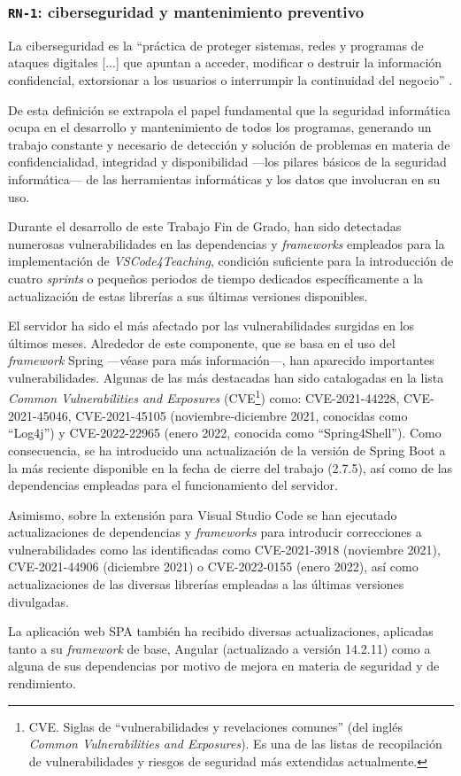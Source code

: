 \subsubsection{\texttt{RN-1}: ciberseguridad y mantenimiento preventivo}
\label{subsec:rn1}

La ciberseguridad es la ``práctica de proteger sistemas, redes y programas de ataques digitales [...] que apuntan a acceder, modificar o destruir la información confidencial, extorsionar a los usuarios o interrumpir la continuidad del negocio'' \cite{rn1_queEsCiber}.

De esta definición se extrapola el papel fundamental que la seguridad informática ocupa en el desarrollo y mantenimiento de todos los programas, generando un trabajo constante y necesario de detección y solución de problemas en materia de confidencialidad, integridad y disponibilidad ---los pilares básicos de la seguridad informática--- de las herramientas informáticas y los datos que involucran en su uso.

Durante el desarrollo de este Trabajo Fin de Grado, han sido detectadas numerosas vulnerabilidades en las dependencias y \textit{frameworks} empleados para la implementación de \textit{VSCode4Teaching}, condición suficiente para la introducción de cuatro \textit{sprints} o pequeños periodos de tiempo dedicados específicamente a la actualización de estas librerías a sus últimas versiones disponibles.

El servidor ha sido el más afectado por las vulnerabilidades surgidas en los últimos meses. Alrededor de este componente, que se basa en el uso del \textit{framework} Spring ---véase  para más información---, han aparecido importantes vulnerabilidades. Algunas de las más destacadas han sido catalogadas en la lista \textit{Common Vulnerabilities and Exposures} (CVE\footnote{CVE. Siglas de ``vulnerabilidades y revelaciones comunes'' (del inglés \textit{Common Vulnerabilities and Exposures}). Es una de las listas de recopilación de vulnerabilidades y riesgos de seguridad más extendidas actualmente.}) \cite{rn1_cve} como: CVE-2021-44228, CVE-2021-45046, CVE-2021-45105 (noviembre-diciembre 2021, conocidas como ``Log4j'') y CVE-2022-22965 (enero 2022, conocida como ``Spring4Shell''). Como consecuencia, se ha introducido una actualización de la versión de Spring Boot a la más reciente disponible en la fecha de cierre del trabajo (2.7.5), así como de las dependencias empleadas para el funcionamiento del servidor.

Asimismo, sobre la extensión para Visual Studio Code se han ejecutado actualizaciones de dependencias y \textit{frameworks} para introducir correcciones a vulnerabilidades como las identificadas como CVE-2021-3918 (noviembre 2021), CVE-2021-44906 (diciembre 2021) o CVE-2022-0155 (enero 2022), así como actualizaciones de las diversas librerías empleadas a las últimas versiones divulgadas.

La aplicación web SPA también ha recibido diversas actualizaciones, aplicadas tanto a su \textit{framework} de base, Angular (actualizado a versión 14.2.11) como a alguna de sus dependencias por motivo de mejora en materia de seguridad y de rendimiento.
